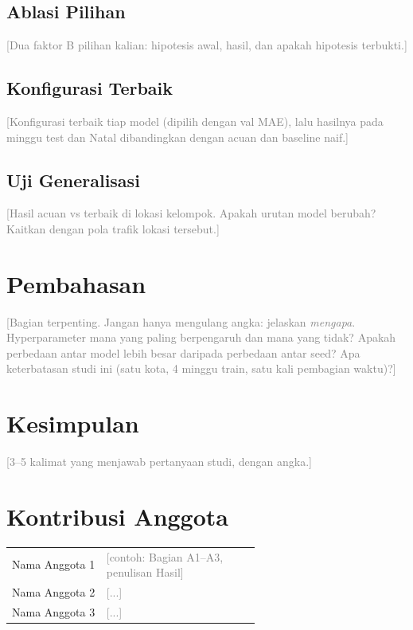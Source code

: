 \documentclass[conference,a4paper]{IEEEtran}
\newcommand{\petunjuk}[1]{\textcolor{gray}{[#1]}}
\begin{document}
\subsection{Ablasi Pilihan}
\petunjuk{Dua faktor B pilihan kalian: hipotesis awal, hasil, dan apakah hipotesis terbukti.}

\subsection{Konfigurasi Terbaik}
\petunjuk{Konfigurasi terbaik tiap model (dipilih dengan val MAE), lalu hasilnya pada minggu test dan Natal dibandingkan dengan acuan dan baseline naif.}

\subsection{Uji Generalisasi}
\petunjuk{Hasil acuan vs terbaik di lokasi kelompok. Apakah urutan model berubah? Kaitkan dengan pola trafik lokasi tersebut.}

\section{Pembahasan}
\petunjuk{Bagian terpenting. Jangan hanya mengulang angka: jelaskan \emph{mengapa}. Hyperparameter mana yang paling berpengaruh dan mana yang tidak? Apakah perbedaan antar model lebih besar daripada perbedaan antar seed? Apa keterbatasan studi ini (satu kota, 4 minggu train, satu kali pembagian waktu)?}

\section{Kesimpulan}
\petunjuk{3--5 kalimat yang menjawab pertanyaan studi, dengan angka.}

\section*{Kontribusi Anggota}
\begin{tabular}{@{}lp{0.62\linewidth}@{}}
  Nama Anggota 1 & \petunjuk{contoh: Bagian A1--A3, penulisan Hasil} \\
  Nama Anggota 2 & \petunjuk{...} \\
  Nama Anggota 3 & \petunjuk{...} \\
\end{tabular}
\end{document}
